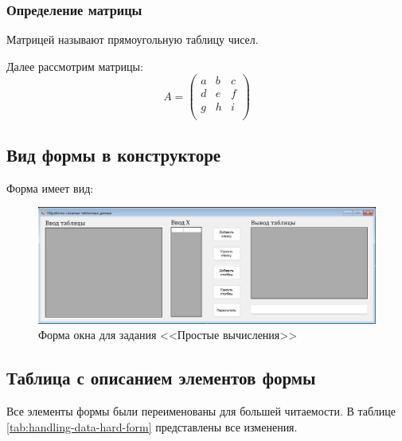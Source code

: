 \subsubsection{Определение матрицы}
Матрицей называют прямоугольную таблицу чисел.

Далее рассмотрим матрицы:
\begin{equation}
    \label{eq:matrix}
    A = \begin{pmatrix} a & b & c \\ d & e & f \\ g & h & i \\ \end{pmatrix}
\end{equation}

\subsection{Вид формы в конструкторе}
Форма имеет вид:

\begin{figure}
\centering
\includegraphics[width=0.5\linewidth]{images/handling-data-hard/form.png}
\caption{Форма окна для задания <<Простые вычисления>>}
\label{handling-data-hard-form}
\end{figure}

\subsection{Таблица с описанием элементов формы}
Все элементы формы были переименованы для большей читаемости. В таблице \ref{tab:handling-data-hard-form} представлены все изменения.


